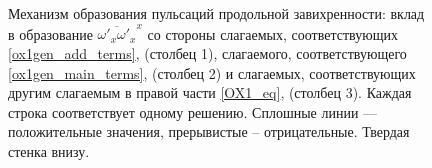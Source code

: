 \begin{figure}
\caption{Механизм образования пульсаций продольной завихренности: вклад в образование $\overline{\omega'_x\omega'_x}^x$ со стороны слагаемых, соответствующих \eqref{ox1gen_add_terms}, (столбец 1), слагаемого, соответствующего \eqref{ox1gen_main_terms}, (столбец 2) и слагаемых, соответствующих другим слагаемым в правой части \eqref{OX1_eq}, (столбец 3). Каждая строка соответствует одному решению. Сплошные линии --- положительные значения, прерывистые -- отрицательные. Твердая стенка внизу. }
\label{ductTW_ox1gen_pic}
\end{figure}

